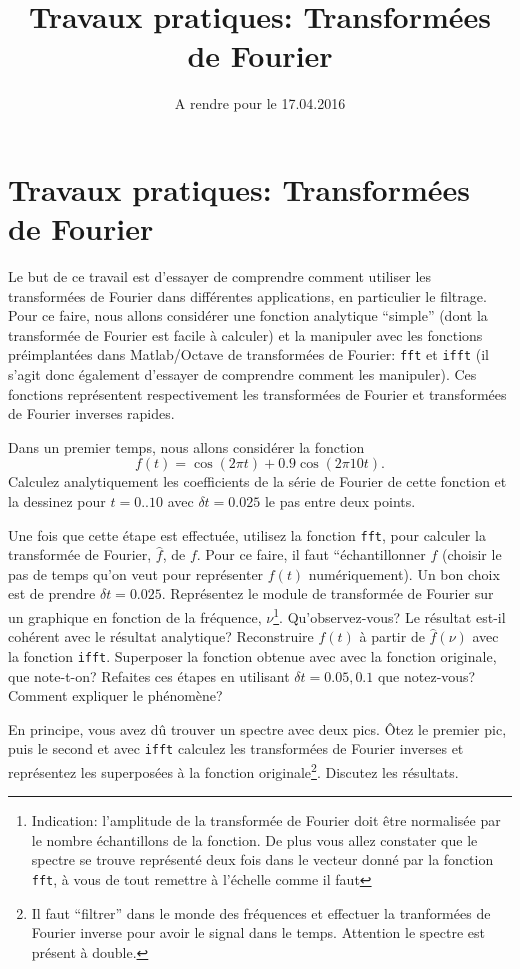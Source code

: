 \documentclass[a4paper,10pt]{article}
\title{Travaux pratiques: Transformées de Fourier}
\date{A rendre pour le 17.04.2016}
\newcommand{\hf}{\hat{f}}
\begin{document}
\maketitle

\section*{Travaux pratiques: Transformées de Fourier}

Le but de ce travail est d'essayer de comprendre comment utiliser les transformées de Fourier dans différentes applications,
en particulier le filtrage. Pour ce faire, nous allons considérer une fonction analytique ``simple'' (dont
la transformée de Fourier est facile à calculer) et la manipuler avec les fonctions préimplantées dans Matlab/Octave de
transformées de Fourier: \texttt{fft} et \texttt{ifft} (il s'agit donc également d'essayer de comprendre comment les manipuler). 
Ces fonctions représentent respectivement les transformées de Fourier et transformées de Fourier inverses rapides.

Dans un premier temps, nous allons considérer la fonction
\begin{equation}
 f(t)=\cos(2\pi t)+0.9\cos(2\pi 10 t).
\end{equation}
Calculez analytiquement les coefficients de la série de Fourier de cette fonction
et la dessinez pour $t=0..10$ avec $\delta t=0.025$ le pas entre deux points.

Une fois que cette étape est effectuée, utilisez la fonction \texttt{fft}, pour 
calculer la transformée de Fourier, $\hf$, de $f$. Pour ce faire,
il faut ``\'echantillonner $f$ (choisir le pas de temps qu'on veut pour représenter 
$f(t)$ numériquement). Un bon choix est de prendre $\delta t=0.025$.
Représentez le module de transformée de Fourier sur un graphique en fonction de la fréquence, $\nu$\footnote{Indication: l'amplitude de la transformée de Fourier doit être normalisée par le 
nombre échantillons de la fonction. De plus vous allez constater que le spectre se trouve représenté deux fois dans le vecteur donné par la fonction \texttt{fft}, à vous de tout remettre à l'échelle comme il faut}.
Qu'observez-vous? Le résultat est-il cohérent avec le résultat analytique? 
Reconstruire $f(t)$ à partir de $\hf(\nu)$ avec la fonction \texttt{ifft}. Superposer la fonction obtenue avec avec la fonction originale, que note-t-on?
Refaites ces étapes en utilisant $\delta t=0.05,0.1$ que notez-vous? Comment expliquer le phénomène?

En principe, vous avez dû trouver un spectre avec deux pics. Ôtez le premier 
pic, puis le second et avec \texttt{ifft} 
calculez les transformées de Fourier inverses et représentez les superposées à la fonction originale\footnote{Il faut ``filtrer'' dans le monde des fréquences et effectuer la tranformées de Fourier inverse pour avoir 
le signal dans le temps. Attention le spectre est présent à double.}. Discutez les résultats.
\end{document}
